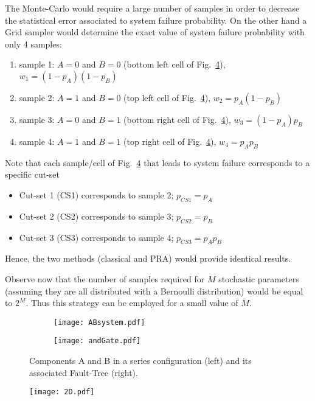 The Monte-Carlo would require a large number of samples in order to decrease the statistical error associated
to system failure probability.
On the other hand a Grid sampler would determine the exact value of system failure probability with only 4 samples:
\begin{enumerate}
  \item sample 1: $A=0$ and $B=0$ (bottom left cell of Fig.~\ref{fig:2Danalogy}), $w_1 = (1-p_A)(1-p_B)$
  \item sample 2: $A=1$ and $B=0$ (top left cell of Fig.~\ref{fig:2Danalogy}), $w_2 = p_A (1-p_B)$
  \item sample 3: $A=0$ and $B=1$ (bottom right cell of Fig.~\ref{fig:2Danalogy}), $w_3 = (1-p_A) p_B$
  \item sample 4: $A=1$ and $B=1$ (top right cell of Fig.~\ref{fig:2Danalogy}), $w_4 = p_A p_B$
\end{enumerate}
Note that each sample/cell of Fig.~\ref{fig:2Danalogy} that leads to system failure corresponds to a specific cut-set
\begin{itemize}
  \item Cut-set 1 (CS1) corresponds to sample 2; $p_{CS1} = p_A$
  \item Cut-set 2 (CS2) corresponds to sample 3; $p_{CS2} = p_B$
  \item Cut-set 3 (CS3) corresponds to sample 4; $p_{CS3} = p_A p_B$
\end{itemize}
Hence, the two methods (classical and PRA) would provide identical results.

Observe now that the number of samples required for $M$ stochastic parameters (assuming they are all distributed with 
a Bernoulli distribution) would be equal to $2^M$. Thus this strategy can be employed for a small value of $M$.


\begin{figure}
  \centering
  \begin{subfigure}{.5\textwidth}
    \centering
    \texttt{[image: ABsystem.pdf]}
    \label{fig:sub1}
  \end{subfigure}%
  \begin{subfigure}{.5\textwidth}
    \centering
    \texttt{[image: andGate.pdf]}
    \label{fig:sub2}
  \end{subfigure}
  \caption{Components A and B in a series configuration (left) and its associated Fault-Tree (right).}
  \label{fig:ABsystem}
\end{figure}

\begin{figure}
    \centering
    \texttt{[image: 2D.pdf]}
    \caption{}
    \label{fig:2Danalogy}
\end{figure} 



